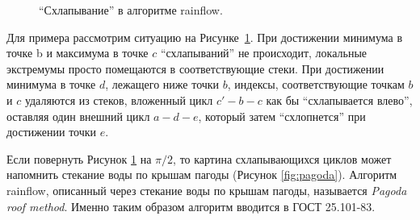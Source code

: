\begin{enumerate}
\begin{figure}[]
\begin{subfigure}[b]{0.45\textwidth}
\end{subfigure}

\caption{``Схлапывание'' в алгоритме rainflow.}
\label{fig:cycles-сollapse}
\end{figure}

Для примера рассмотрим ситуацию на Рисунке~\ref{fig:cycles-сollapse}.
При достижении минимума в точке b и максимума в точке $c$ ``схлапываний'' не происходит,
локальные экстремумы просто помещаются в  соответствующие стеки.
При достижении минимума в точке $d$, лежащего ниже точки $b$, 
индексы,  соответствующие точкам $b$ и $c$ удаляются из стеков,
вложенный цикл $c'-b-c$ как бы ``схлапывается влево'', 
оставляя один внешний цикл $a-d-e$, который затем ``схлопнется'' при достижении точки $e$. 

Если повернуть Рисунок \ref{fig:cycles-сollapse} на $\pi/2$, то картина схлапывающихся циклов может напомнить стекание воды по крышам пагоды (Рисунок \ref{fig:pagoda}).
Алгоритм rainflow, описанный через стекание воды по крышам пагоды, называется \textit{Pagoda roof method}.
Именно таким образом алгоритм вводится в ГОСТ 25.101-83.


\end{enumerate}
